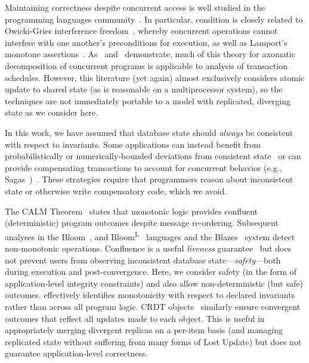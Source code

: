  Maintaining correctness despite concurrent
access is well studied in the programming languages
community~\cite{schneider-concurrent}. In particular, \iconfluence
condition is closely related to Owicki-Gries interference
freedom~\cite{owickigries}, whereby concurrent operations cannot
interfere with one another's preconditions for execution, as well as
Lamport's monotone
assertions~\cite{schneider-concurrent}. As~\cite{agarwal-consistency}
and~\cite{decomp-semantics} demonstrate, much of this theory for
axomatic decomposition of concurrent programs is applicable to
analysis of transaction schedules. However, this literature (yet
again) almost exclusively considers atomic update to shared state (as
is reasonable on a multiprocessor system), so the techniques are not
immediately portable to a model with replicated, diverging state as we
consider here.

 In this work, we have assumed that
database state should \textit{always} be consistent with respect to
invariants. Some applications can instead benefit from
probabilistically or numerically-bounded deviations from consistent
state~\cite{epsilon-divergence} or can provide compensating
transactions to account for concurrent behavior (e.g.,
Sagas~\cite{sagas})~\cite{ic-survey,ic-survey-two}. These strategies
require that programmers reason about inconsistent state or otherwise
write compensatory code, which we avoid.

 The CALM
Theorem~\cite{ameloot-calm} states that monotonic logic provides
confluent (deterministic) program outcomes despite message
re-ordering. Subsequent analyses in the Bloom~\cite{calm}, and
Bloom\textsuperscript{L}~\cite{blooml} languages and the
Blazes~\cite{blazes} system detect non-monotonic
operations. Confluence is a useful \textit{liveness}
guarantee~\cite{schneider-concurrent} but does not prevent users from
observing inconsistent database state---\textit{safety}---both during
execution and post-convergence. Here, we consider safety (in the form
of application-level integrity constraints) and also allow
non-deterministic (but safe) outcomes. \iconfluence effectively
identifies monotonicity with respect to declared invariants rather
than across all program logic. CRDT objects~\cite{crdt} similarly
ensure convergent outcomes that reflect all updates made to each
object. This is useful in appropriately merging divergent replicas on
a per-item basis (and managing replicated state without suffering from
many forms of Lost Update) but does not guarantee application-level
correctness.

